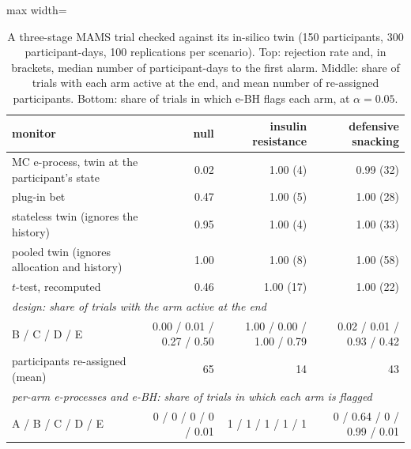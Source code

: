 \documentclass[12pt]{article}
\theoremstyle{remark}
\begin{document}
\begin{table}[t]
\centering
\caption{A three-stage MAMS trial checked against its in-silico twin (150
participants, 300 participant-days, 100 replications per scenario). Top:
rejection rate and, in brackets, median number of participant-days to the
first alarm. Middle: share of trials with each arm active at the end, and mean
number of re-assigned participants. Bottom: share of trials in which e-BH
flags each arm, at $\alpha = 0.05$.}
\label{tab:trial}
\begin{adjustbox}{max width=\textwidth}
\begin{tabular}{lrrr}
\toprule
monitor & null & insulin resistance & defensive snacking \\
\midrule
MC e-process, twin at the participant's state & 0.02 & 1.00 (4) & 0.99 (32) \\
plug-in bet & 0.47 & 1.00 (5) & 1.00 (28) \\
stateless twin (ignores the history) & 0.95 & 1.00 (4) & 1.00 (33) \\
pooled twin (ignores allocation and history) & 1.00 & 1.00 (8) & 1.00 (58) \\
$t$-test, recomputed & 0.46 & 1.00 (17) & 1.00 (22) \\
\midrule
\multicolumn{4}{l}{\emph{design: share of trials with the arm active at the end}} \\
B / C / D / E & 0.00 / 0.01 / 0.27 / 0.50 & 1.00 / 0.00 / 1.00 / 0.79 & 0.02 / 0.01 / 0.93 / 0.42 \\
participants re-assigned (mean) & 65 & 14 & 43 \\
\midrule
\multicolumn{4}{l}{\emph{per-arm e-processes and e-BH: share of trials in which each arm is flagged}} \\
A / B / C / D / E & 0 / 0 / 0 / 0 / 0.01 & 1 / 1 / 1 / 1 / 1 & 0 / 0.64 / 0 / 0.99 / 0.01 \\
\bottomrule
\end{tabular}
\end{adjustbox}
\end{table}
\end{document}
